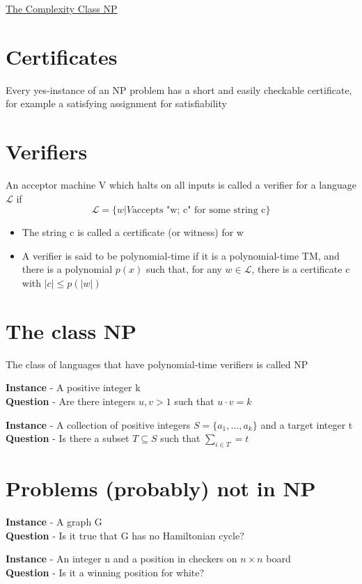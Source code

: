 \documentclass{article}[18pt]
\begin{document}
\begin{center}
\underline{\huge The Complexity Class NP}
\end{center}
\section{Certificates}
Every yes-instance of an NP problem has a short and easily checkable certificate, for example a satisfying assignment for satisfiability
\section{Verifiers}
\begin{definition}[Acceptor]
An acceptor machine V which halts on all inputs is called a verifier for a language $\mathcal{L}$ if
$$\mathcal{L}=\{w| V \text{accepts "w; c" for some string c}\}$$
\end{definition}
\begin{itemize}
	\item The string c is called a certificate (or witness) for w
	\item A verifier is said to be polynomial-time if it is a polynomial-time TM, and there is a polynomial $p(x)$ such that, for any $w\in \mathcal{L}$, there is a certificate c with $|c|\leqslant p(|w|)$
\end{itemize}
\section{The class NP}
\begin{definition}[NP]
	The class of languages that have polynomial-time verifiers is called NP
\end{definition}
\begin{problem}
\textbf{Instance} - A positive integer k\\
\textbf{Question} - Are there integers $u,v>1$ such that $u\cdot v=k$
\end{problem}
\begin{problem}
\textbf{Instance} - A collection of positive integers $S=\{a_1,...,a_k\}$ and a target integer t\\
\textbf{Question} - Is there a subset $T\subseteq S$ such that $\sum_{i\in T}=t$
\end{problem}
\section{Problems (probably) not in NP}
\begin{problem}
\textbf{Instance} - A graph G\\
\textbf{Question} - Is it true that G has no Hamiltonian cycle?
\end{problem}
\begin{problem}[Checkers]
\textbf{Instance} - An integer n and a position in checkers on $n\times n$ board\\
\textbf{Question} - Is it a winning position for white?
\end{problem}
\end{document}
